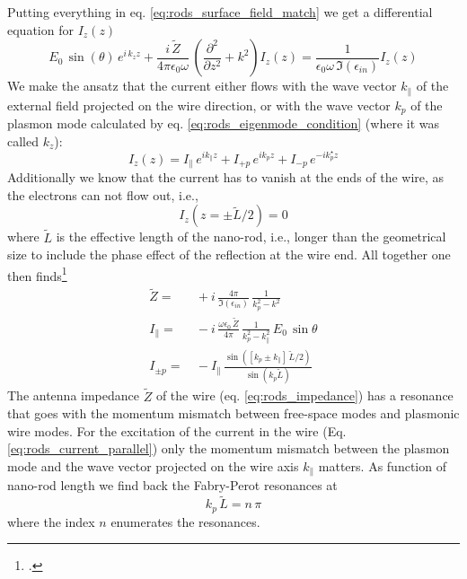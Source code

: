 Putting everything in eq. \ref{eq:rods_surface_field_match} we get a differential equation for $I_z(z)$
\begin{equation}
  E_0 \, \sin ( \theta) \, e^{i \, k_z z} + \frac{i \, \tilde{Z}}{4 \pi  \epsilon_0 \omega} \,   
  \left( \frac{\partial^2}{\partial z^2} + k^2 \right)  I_z(z)
  = \frac{1}{ \epsilon_0 \omega  \, \Im(\epsilon_{in})} I_z(z)
\end{equation}
We make the ansatz that the current either flows with the wave vector $k_\parallel$ of the external field projected on the wire direction, or with the wave vector $k_p$ of the plasmon mode calculated by eq. \ref{eq:rods_eigenmode_condition}  (where it was called $k_z$):
\begin{equation}
  I_z(z) = I_\parallel \, e^{i k_\parallel z} + I_{+p} \, e^{i k_p z} + I_{-p} \, e^{-i k_p^\star z} \label{eq:rods_currents}
\end{equation}
Additionally we know that the current has to vanish at the ends of the wire, as the electrons can not flow out, i.e.,
\begin{equation}
  I_z \left(z = \pm  \tilde{L} / 2  \right) = 0 
\end{equation}
where $\tilde{L}$ is the effective length of the nano-rod, i.e., longer than the geometrical size to include the phase effect of the reflection at the wire end. 
All together one then finds\footcite{Dorfmueller10}
\begin{align}
  \tilde{Z} = & \, + i \, \frac{4 \pi }{\Im(\epsilon_{in})} \,
  \frac{1 }{  k_p^2 -k^2} \label{eq:rods_impedance}\\
  I_\parallel = & \, -i \,  
  \frac{\omega \epsilon_0 \,\tilde{Z}}{4 \pi} \, 
  \frac{1 }{k_p^2 - k_\parallel^2 } \, E_0  \, \sin \theta \label{eq:rods_current_parallel}\\
%
  I_{\pm p} = & \, - I_\parallel \, \frac{\sin ( [ k_p \pm k_\parallel] \,\tilde{L}/2 )}{\sin( k_p \tilde{L})}
\end{align}
The antenna impedance $ \tilde{Z}$ of the wire (eq.  \ref{eq:rods_impedance}) has a resonance that goes with the momentum mismatch between free-space modes and plasmonic wire modes. For the excitation of the current in the wire (Eq. \ref{eq:rods_current_parallel}) only the momentum mismatch between the plasmon mode and the wave vector projected on the wire axis $k_\parallel$ matters. As function of nano-rod length we find back the Fabry-Perot resonances at 
\begin{equation}
  k_p \, \tilde{L} = n \, \pi 
\end{equation}
where the index $n$ enumerates the resonances.

